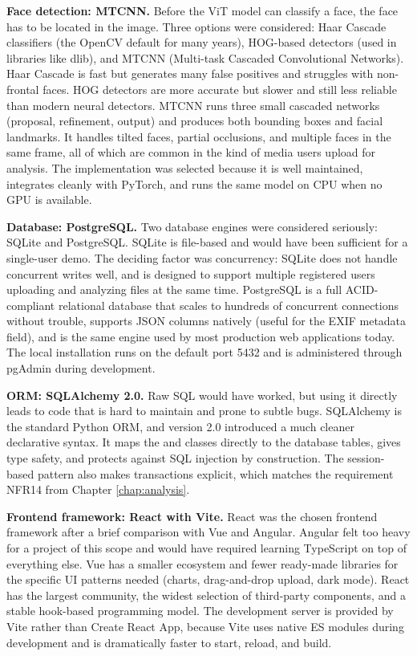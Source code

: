 \noindent\textbf{Face detection: MTCNN.} Before the ViT model can classify a face, the face has to be located in the image. Three options were considered: Haar Cascade classifiers (the OpenCV default for many years), HOG-based detectors (used in libraries like dlib), and MTCNN (Multi-task Cascaded Convolutional Networks). Haar Cascade is fast but generates many false positives and struggles with non-frontal faces. HOG detectors are more accurate but slower and still less reliable than modern neural detectors. MTCNN runs three small cascaded networks (proposal, refinement, output) and produces both bounding boxes and facial landmarks. It handles tilted faces, partial occlusions, and multiple faces in the same frame, all of which are common in the kind of media users upload for analysis. The  implementation was selected because it is well maintained, integrates cleanly with PyTorch, and runs the same model on CPU when no GPU is available.

\noindent\textbf{Database: PostgreSQL.} Two database engines were considered seriously: SQLite and PostgreSQL. SQLite is file-based and would have been sufficient for a single-user demo. The deciding factor was concurrency: SQLite does not handle concurrent writes well, and \deepguard{} is designed to support multiple registered users uploading and analyzing files at the same time. PostgreSQL is a full ACID-compliant relational database that scales to hundreds of concurrent connections without trouble, supports JSON columns natively (useful for the EXIF metadata field), and is the same engine used by most production web applications today. The local installation runs on the default port 5432 and is administered through pgAdmin during development.

\noindent\textbf{ORM: SQLAlchemy 2.0.} Raw SQL would have worked, but using it directly leads to code that is hard to maintain and prone to subtle bugs. SQLAlchemy is the standard Python ORM, and version 2.0 introduced a much cleaner declarative syntax. It maps the  and  classes directly to the database tables, gives type safety, and protects against SQL injection by construction. The session-based pattern also makes transactions explicit, which matches the requirement NFR14 from Chapter \ref{chap:analysis}.

\noindent\textbf{Frontend framework: React with Vite.} React was the chosen frontend framework after a brief comparison with Vue and Angular. Angular felt too heavy for a project of this scope and would have required learning TypeScript on top of everything else. Vue has a smaller ecosystem and fewer ready-made libraries for the specific UI patterns needed (charts, drag-and-drop upload, dark mode). React has the largest community, the widest selection of third-party components, and a stable hook-based programming model. The development server is provided by Vite rather than Create React App, because Vite uses native ES modules during development and is dramatically faster to start, reload, and build.

